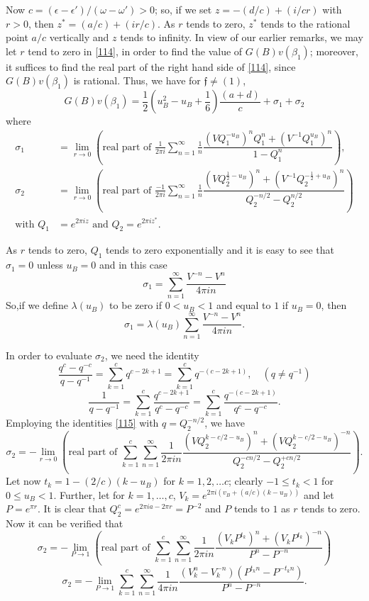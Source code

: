 Now $c=(\epsilon-\epsilon')/(\omega-\omega')>0$; so, if we set
$z=-(d/c)+(i/cr)$ with $r>0$, then $z^{\ast}=(a/c)+(ir/c)$. As $r$
tends to zero, $z^{\ast}$ tends to the rational point $a/c$ vertically
and $z$ tends to infinity. In view of our earlier remarks, we may let
$r$ tend to zero in \eqref{114}, in order to find the value of
$G(B)v(\beta_{1})$; moreover, it suffices to find the real part of the
right hand side of \eqref{114}, since $G(B)v(\beta_{1})$ is
rational. Thus, we have for $\mathfrak{f}\neq (1)$,
$$
G(B)v(\beta_{1})=\frac{1}{2}\left(u^{2}_{B}-u_{B}+\frac{1}{6}\right)\frac{(a+d)}{c}+\sigma_{1}+\sigma_{2} 
$$
where
\begin{align*}
\sigma_{1} &= \lim\limits_{r\to 0}\left(\text{real part of }
\frac{1}{2\pi
  i}\sum^{\infty}_{n=1}\frac{1}{n}\dfrac{(VQ^{-u_{B}}_{1})^{n}Q^{n}_{1}+(V^{-1}Q^{u_{B}}_{1})^{n}}{1-Q^{n}_{1}}\right),\\
\sigma_{2} &= \lim\limits_{r\to 0}\left(\text{real part of }
\frac{-1}{2\pi
  i}\sum^{\infty}_{n=1}\frac{1}{n}\dfrac{(VQ^{\frac{1}{2}-u_{B}}_{2})^n
  + (V^{-1}Q^{-\frac{1}{2}+u_{B}}_{2})^{n}}{Q^{-n/2}_{2}-Q^{n/2}_{2}}\right)\\
\text{with } Q_{1} &= e^{2\pi iz}\text{ \  and \ } Q_{2}=e^{2\pi iz^{\ast}}.
\end{align*}

As $r$ tends to zero, $Q_{1}$ tends to zero exponentially and it is
easy to see that $\sigma_{1}=0$ unless $u_{B}=0$ and in this case
$$
\sigma_{1}=\sum^{\infty}_{n=1}\frac{V^{-n}-V^{n}}{4\pi in}
$$
So,\pageoriginale if we define $\lambda(u_{B})$ to be zero if
$0<u_{B}<1$ and equal to $1$ if $u_{B}=0$, then
$$
\sigma_{1}=\lambda(u_{B})\sum^{\infty}_{n=1}\frac{V^{-n}-V^{n}}{4\pi
  in}.
$$

In order to evaluate $\sigma_{2}$, we need the identity
$$
\frac{q^{c}-q^{-c}}{q-q^{-1}}=\sum^{c}_{k=1}q^{c-2k+1}=\sum^{c}_{k=1}q^{-(c-2k+1)},\quad
(q\neq q^{-1}) 
$$
\ie
\begin{equation*}
\frac{1}{q-q^{-1}}=\sum^{c}_{k=1}\frac{q^{c-2k+1}}{q^{c}-q^{-c}}=\sum^{c}_{k=1}\frac{q^{-(c-2k+1)}}{q^{c}-q^{-c}}.\tag{115}\label{115}
\end{equation*}
Employing the identities \eqref{115} with $q=Q^{-n/2}_{2}$, we have
$$
\sigma_{2}=-\lim\limits_{r\to 0}\left(\text{real part of }
\sum^{c}_{k=1}\sum^{\infty}_{n=1}\frac{1}{2\pi
  in}\frac{(VQ^{k-c/2-u_{B}}_{2})^{n}+(VQ^{k-c/2-u_{B}}_{2})^{-n}}{Q^{-cn/2}_{2}-Q^{+cn/2}_{2}}\right). 
$$
Let now $t_{k}=1-(2/c)(k-u_{B})$ for $k=1,2,\ldots c$; clearly $-1\leq
t_{k}<1$ for $0\leq u_{B}<1$. Further, let for $k=1,\ldots,c$,
$V_{k}=e^{2\pi i(v_{B}+(a/c)(k-u_{B}))}$ and let $P=e^{\pi r}$. It is
clear that $Q^{c}_{2}=e^{2\pi ia-2\pi r}=P^{-2}$ and $P$ tends to $1$
as $r$ tends to zero. Now it can be verified that
$$
\sigma_{2}=-\lim\limits_{P\to 1}\left(\text{real part of }
\sum^{c}_{k=1}\sum^{\infty}_{n=1}\frac{1}{2\pi
  in}\frac{(V_{k}P^{t_{k}})^{n}+(V_{k}P^{t_{k}})^{-n}}{P^{n}-P^{-n}}\right)
$$
\ie
\begin{equation*}
\sigma_{2}=-\lim\limits_{P\to
  1}\sum^{c}_{k=1}\sum^{\infty}_{n=1}\frac{1}{4\pi in}\frac{(V^{n}_{k}-V^{-n}_{k})(P^{t_{k}n}-P^{-t_{k}n})}{P^{n}-P^{-n}}.\tag{116}\label{116}
\end{equation*}

